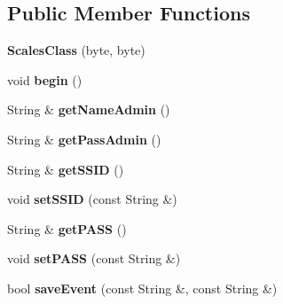 \subsection*{Public Member Functions}
\begin{DoxyCompactItemize}
\item 
\hypertarget{class_scales_class_a189a463dc4bbb17591352d7a85228cf1}{{\bfseries Scales\-Class} (byte, byte)}\label{class_scales_class_a189a463dc4bbb17591352d7a85228cf1}

\item 
\hypertarget{class_scales_class_a553aee26294d6b3eacae77fbd9b8ebc0}{void {\bfseries begin} ()}\label{class_scales_class_a553aee26294d6b3eacae77fbd9b8ebc0}

\item 
\hypertarget{class_scales_class_a754b2b73b364e57bf88b7c1c9c4d4cc5}{String \& {\bfseries get\-Name\-Admin} ()}\label{class_scales_class_a754b2b73b364e57bf88b7c1c9c4d4cc5}

\item 
\hypertarget{class_scales_class_accc3e06b6937d608440dfa034a887c40}{String \& {\bfseries get\-Pass\-Admin} ()}\label{class_scales_class_accc3e06b6937d608440dfa034a887c40}

\item 
\hypertarget{class_scales_class_ad01a18c04562555899189c2403db5d61}{String \& {\bfseries get\-S\-S\-I\-D} ()}\label{class_scales_class_ad01a18c04562555899189c2403db5d61}

\item 
\hypertarget{class_scales_class_ae835d3b9b2f0d801309a2b287ecaad2d}{void {\bfseries set\-S\-S\-I\-D} (const String \&)}\label{class_scales_class_ae835d3b9b2f0d801309a2b287ecaad2d}

\item 
\hypertarget{class_scales_class_a1b984be210a6c9081aa3015d779ba9e5}{String \& {\bfseries get\-P\-A\-S\-S} ()}\label{class_scales_class_a1b984be210a6c9081aa3015d779ba9e5}

\item 
\hypertarget{class_scales_class_acdaedb79c43dcc4cfa949bbcb3755d8a}{void {\bfseries set\-P\-A\-S\-S} (const String \&)}\label{class_scales_class_acdaedb79c43dcc4cfa949bbcb3755d8a}

\item 
\hypertarget{class_scales_class_afbce9abe56d54e9d915a90d629157ade}{bool {\bfseries save\-Event} (const String \&, const String \&)}\label{class_scales_class_afbce9abe56d54e9d915a90d629157ade}


\end{DoxyCompactItemize}
